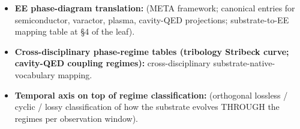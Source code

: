 \begin{itemize}
    \item \textbf{EE phase-diagram translation:}  (META framework; canonical entries for semiconductor, varactor, plasma, cavity-QED projections; substrate-to-EE mapping table at \S 4 of the leaf).
    \item \textbf{Cross-disciplinary phase-regime tables (tribology Stribeck curve; cavity-QED coupling regimes):} cross-disciplinary substrate-native-vocabulary mapping.
    \item \textbf{Temporal axis on top of regime classification:}  (orthogonal lossless / cyclic / lossy classification of how the substrate evolves THROUGH the regimes per observation window).
\end{itemize}

